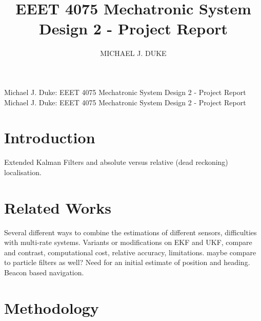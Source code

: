 \documentclass{ieeeaccess}
\begin{document}

\title{EEET 4075 Mechatronic System Design 2 - Project Report}
\author{\uppercase{Michael J. Duke}}
\address[1]{University of South Australia, Mawson Lakes, SA 5095 Australia (e-mail: dukmj002@mymail.unisa.edu.au)}

\markboth
{Michael J. Duke: EEET 4075 Mechatronic System Design 2 - Project Report}
{Michael J. Duke: EEET 4075 Mechatronic System Design 2 - Project Report}

\titlepgskip=-15pt

\maketitle

\section{Introduction}
\label{sec:introduction}
 Extended Kalman Filters and absolute versus relative (dead reckoning) localisation.

\section{Related Works}
\label{sec:rel}
Several different ways to combine the estimations of different sensors, difficulties with multi-rate systems. Variants or modifications on EKF and UKF, compare and contrast, computational cost, relative accuracy, limitations. maybe compare to particle filters as well? Need for an initial estimate of position and heading. Beacon based navigation.

\section{Methodology}
\label{sec:meth}
\end{document}
